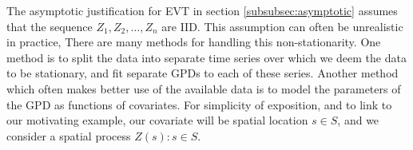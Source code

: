 \documentclass{article}
\numberwithin{equation}{section}
\begin{document}
The asymptotic justification for EVT in section \ref{subsubsec:asymptotic} assumes that the sequence $Z_1, Z_2, \ldots, Z_n$ are IID.
This assumption can often be unrealistic in practice, 
There are many methods for handling this non-stationarity. 
One method is to split the data into separate time series over which we deem the data to be stationary, and fit separate GPDs to each of these series.
Another method which often makes better use of the available data is to model the parameters of the GPD as functions of covariates. 
For simplicity of exposition, and to link to our motivating example, our covariate will be spatial location $s \in S$, and we consider a spatial process $Z(s): s \in S$.
\end{document}
